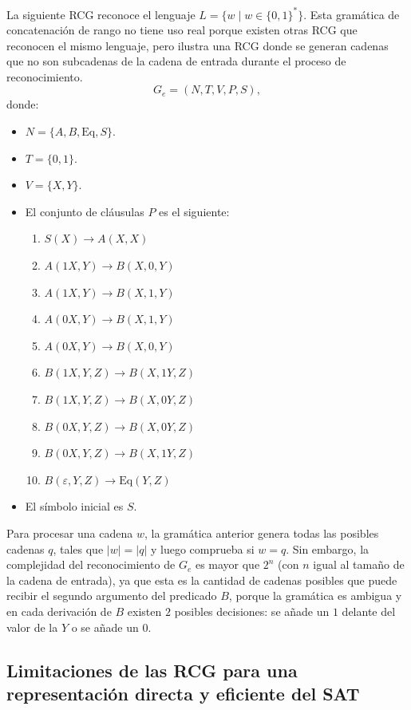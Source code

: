 \documentclass{report}
\theoremstyle{definition}
\theoremstyle{plain}
\theoremstyle{remark}
\begin{document}
La siguiente RCG reconoce el lenguaje $L = \{ w \mid w \in \{0, 1\}^* \}$.
Esta gramática de concatenación de rango no tiene uso real porque
existen otras RCG que reconocen el mismo lenguaje, pero ilustra una RCG
donde se generan cadenas que no son subcadenas de la cadena de entrada
durante el proceso de reconocimiento.
\[
  G_e = (N, T, V, P, S),
\]
donde:
\begin{itemize}
  \item $N = \{A, B, \mathrm{Eq}, S\}$.
  \item $T = \{0, 1\}$.
  \item $V = \{X, Y\}$.
  \item El conjunto de cláusulas $P$ es el siguiente:
    \begin{enumerate}
      \item $S(X) \to A(X, X)$
      \item $A(1X, Y) \to B(X, 0, Y)$
      \item $A(1X, Y) \to B(X, 1, Y)$
      \item $A(0X, Y) \to B(X, 1, Y)$
      \item $A(0X, Y) \to B(X, 0, Y)$
      \item $B(1X, Y, Z) \to B(X, 1Y, Z)$
      \item $B(1X, Y, Z) \to B(X, 0Y, Z)$
      \item $B(0X, Y, Z) \to B(X, 0Y, Z)$
      \item $B(0X, Y, Z) \to B(X, 1Y, Z)$
      \item $B(\varepsilon, Y, Z) \to \mathrm{Eq}(Y, Z)$
    \end{enumerate}
  \item El símbolo inicial es $S$.
\end{itemize}

Para procesar una cadena $w$, la gramática anterior genera todas las
posibles cadenas $q$, tales que $|w| = |q|$ y luego comprueba si
$w = q$. Sin embargo, la complejidad del reconocimiento de $G_e$ es
mayor que $2^n$ (con $n$ igual al tamaño de la cadena de entrada), ya
que esta es la cantidad de cadenas posibles que puede recibir el segundo
argumento del predicado $B$, porque la gramática es ambigua y en cada
derivación de $B$ existen $2$ posibles decisiones: se añade un $1$
delante del valor de la $Y$ o se añade un $0$.

\subsection{Limitaciones de las RCG para una representación directa y
eficiente del SAT}
\end{document}

